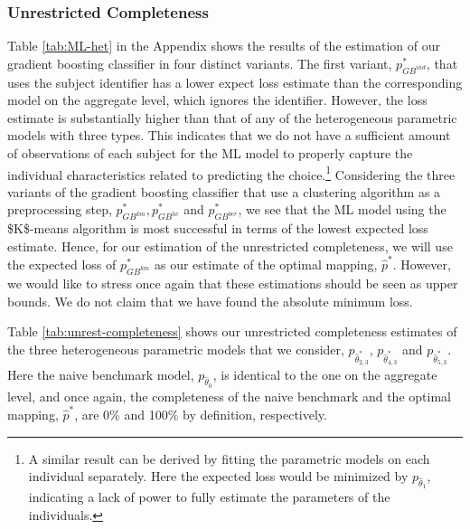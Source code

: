 \documentclass[11pt,a4paper]{article}
\theoremstyle{definition}
\begin{document}
\subsubsection{Unrestricted Completeness}
\label{subsubsec:unrestricted_completeness_res}
Table \ref{tab:ML-het} in the Appendix shows the results of the estimation of our gradient boosting classifier in four distinct variants. The first variant, $p^*_{GB^{ind}}$, that uses the subject identifier has a lower expect loss estimate than the corresponding model on the aggregate level, which ignores the identifier. However, the loss estimate is substantially higher than that of any of the heterogeneous parametric models with three types. This indicates that we do not have a sufficient amount of observations of each subject for the ML model to properly capture the individual characteristics related to predicting the choice.\footnote{A similar result can be derived by fitting the parametric models on each individual separately. Here the expected loss would be minimized by $p_{\hat{\theta}_1}$, indicating a lack of power to fully estimate the parameters of the individuals.} Considering the three variants of the gradient boosting classifier that use a clustering algorithm as a preprocessing step,  $p^*_{GB^{km}},p^*_{GB^{hc}}$ and $p^*_{GB^{ber}}$, we see that the ML model using the \$K\$-means algorithm is most successful in terms of the lowest expected loss estimate. Hence, for our estimation of the unrestricted completeness, we will use the expected loss of $p^*_{GB^{km}}$ as our estimate of the optimal mapping, $\hat{p}^*$. However, we would like to stress once again that these estimations should be seen as upper bounds. We do not claim that we have found the absolute minimum loss.

Table \ref{tab:unrest-completeness} shows our unrestricted completeness estimates of the three heterogeneous parametric models that we consider, $p_{\hat{\theta}_{2,3}^*}$, $p_{\hat{\theta}_{4,3}^*}$ and $p_{\hat{\theta}_{5,3}^*}$. Here the naive benchmark model, $p_{\hat{\theta}_0}$, is identical to the one on the aggregate level, and once again, the completeness of the naive benchmark and the optimal mapping, $\hat{p}^*$, are 0\% and 100\% by definition, respectively.
\end{document}
